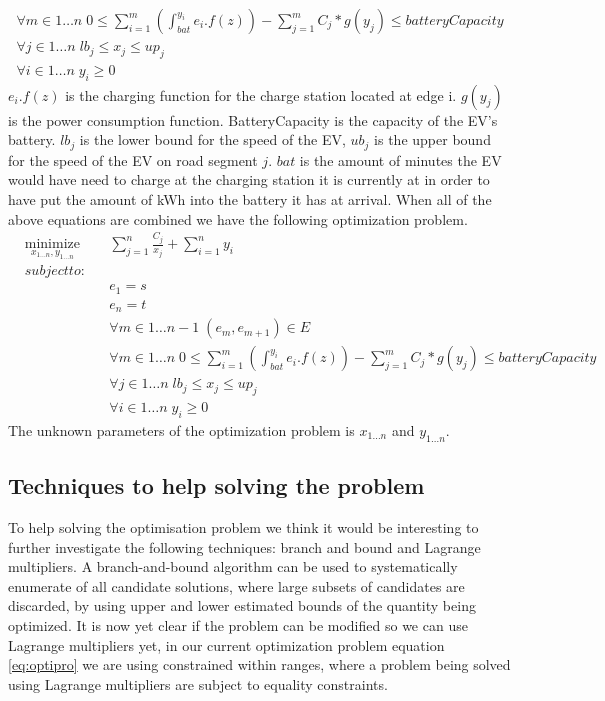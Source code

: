 \begin{gather}
\forall{m \in 1 \dots n} \; 0 \leq \sum_{i=1}^{m} \left( \int_{bat}^{y_i} e_i.f(z) \right) - \sum_{j=1}^{m} C_j*g(y_j) \leq batteryCapacity \\
\forall{j \in 1 \dots n} \; lb_j \leq x_j \leq up_j \\
\forall{i \in 1 \dots n} \; y_i \geq 0
\end{gather}\label{eq:physicalconstraints}
$e_i.f(z)$ is the charging function for the charge station located at edge i. $g(y_j)$ is the power consumption function. BatteryCapacity is the capacity of the EV's battery. 
$lb_j$ is the lower bound for the speed of the EV, $ub_j$ is the upper bound for the speed of the EV on road segment $j$. $bat$ is the amount of minutes the EV would have need to charge at the charging station it is currently at in order to have put the amount of kWh into the battery it has at arrival. When all of the above equations are combined we have the following optimization problem. 
\begin{equation}
\begin{aligned}
&\underset{x_{1 \dots n},y_{1 \dots n}}{\text{minimize}}
& &\sum_{j=1}^{n} \frac{C_j}{x_j} + \sum_{i=1}^{n} y_i \\
&subject to: \\
&&&e_1 = s \\
&&&e_n = t \\
&&&\forall{m \in 1 \dots n-1} \; (e_m, e_{m+1}) \in E \\
&&&\forall{m \in 1 \dots n} \; 0 \leq \sum_{i=1}^{m} \left( \int_{bat}^{y_i} e_i.f(z) \right) - \sum_{j=1}^{m} C_j*g(y_j) \leq batteryCapacity \\
&&&\forall{j \in 1 \dots n} \; lb_j \leq x_j \leq up_j \\
&&&\forall{i \in 1 \dots n} \; y_i \geq 0 
\end{aligned}
\end{equation} \label{eq:optiproblem}
The unknown parameters of the optimization problem is $x_{1\dots n}$ and $y_{1\dots n}$. 


\subsection{Techniques to help solving the problem}
To help solving the optimisation problem we think it would be interesting to further investigate the following techniques: branch and bound and Lagrange multipliers.
A branch-and-bound algorithm can be used to systematically enumerate  of all candidate solutions, where large subsets of candidates are discarded, by using upper and lower estimated bounds of the quantity being optimized. 
It is now yet clear if the problem can be modified so we can use Lagrange multipliers yet, in our current optimization problem equation \ref{eq:optipro} we are using constrained within ranges, where a problem being solved using Lagrange multipliers are subject to equality constraints.


